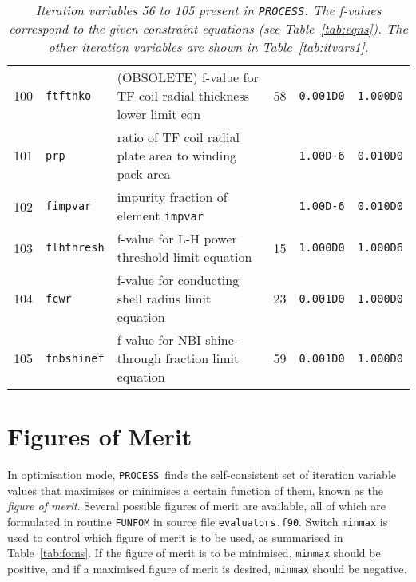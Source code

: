 \documentclass[11pt,a4paper]{report}
\newcommand{\process}{\mbox{\texttt{PROCESS}}}
\begin{document}
\begin{table}[tbph]
\begin{center}
\begin{tabular}{||c|l|l|c|c|c||}
100 & \texttt{ftfthko}  & (OBSOLETE) f-value for TF coil radial thickness lower limit eqn    & 58  & \texttt{0.001D0} & \texttt{1.000D0} \\
101 & \texttt{prp}      & ratio of TF coil radial plate area to winding pack area &     & \texttt{1.00D-6} & \texttt{0.010D0} \\
102 & \texttt{fimpvar}  & impurity fraction of element \texttt{impvar}            &     & \texttt{1.00D-6} & \texttt{0.010D0} \\
103 & \texttt{flhthresh}& f-value for L-H power threshold limit equation          & 15  & \texttt{1.000D0} & \texttt{1.000D6} \\
104 & \texttt{fcwr}     & f-value for conducting shell radius limit equation      & 23  & \texttt{0.001D0} & \texttt{1.000D0} \\
105 & \texttt{fnbshinef}& f-value for NBI shine-through fraction limit equation   & 59  & \texttt{0.001D0} & \texttt{1.000D0} \\
\hline
\end{tabular}
\end{center}
\caption[List of iteration variables 56 to 105]
{\label{tab:itvars2}
  \textit{Iteration variables 56 to 105 present in \process. The f-values correspond to the
    given constraint equations (see Table~\ref{tab:eqns}). The other iteration
    variables are shown in Table~\ref{tab:itvars1}.}
}
\end{table}
\normalsize


\section{Figures of Merit}
\label{sec:foms}

In optimisation mode, \process\ finds the self-consistent set of iteration
variable values that maximises or minimises a certain function of them, known
as the \textit{figure of merit}. Several possible figures of merit are
available, all of which are formulated in routine \texttt{FUNFOM} in source
file \texttt{evaluators.f90}.  Switch \texttt{minmax} is used to control which
figure of merit is to be used, as summarised in Table~\ref{tab:foms}. If the
figure of merit is to be minimised, \texttt{minmax} should be positive, and if
a maximised figure of merit is desired, \texttt{minmax} should be negative.

\end{document}
